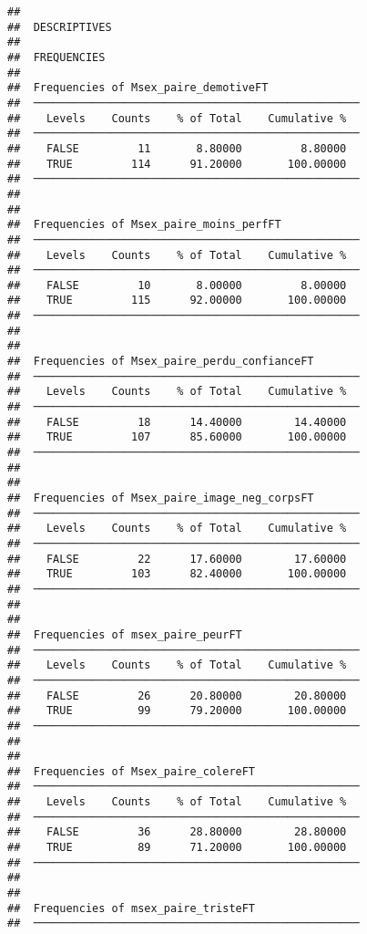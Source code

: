 \documentclass[
]{article}
\begin{document}
\begin{verbatim}
## 
##  DESCRIPTIVES
## 
##  FREQUENCIES
## 
##  Frequencies of Msex_paire_demotiveFT               
##  ────────────────────────────────────────────────── 
##    Levels    Counts    % of Total    Cumulative %   
##  ────────────────────────────────────────────────── 
##    FALSE         11       8.80000         8.80000   
##    TRUE         114      91.20000       100.00000   
##  ────────────────────────────────────────────────── 
## 
## 
##  Frequencies of Msex_paire_moins_perfFT             
##  ────────────────────────────────────────────────── 
##    Levels    Counts    % of Total    Cumulative %   
##  ────────────────────────────────────────────────── 
##    FALSE         10       8.00000         8.00000   
##    TRUE         115      92.00000       100.00000   
##  ────────────────────────────────────────────────── 
## 
## 
##  Frequencies of Msex_paire_perdu_confianceFT        
##  ────────────────────────────────────────────────── 
##    Levels    Counts    % of Total    Cumulative %   
##  ────────────────────────────────────────────────── 
##    FALSE         18      14.40000        14.40000   
##    TRUE         107      85.60000       100.00000   
##  ────────────────────────────────────────────────── 
## 
## 
##  Frequencies of Msex_paire_image_neg_corpsFT        
##  ────────────────────────────────────────────────── 
##    Levels    Counts    % of Total    Cumulative %   
##  ────────────────────────────────────────────────── 
##    FALSE         22      17.60000        17.60000   
##    TRUE         103      82.40000       100.00000   
##  ────────────────────────────────────────────────── 
## 
## 
##  Frequencies of msex_paire_peurFT                   
##  ────────────────────────────────────────────────── 
##    Levels    Counts    % of Total    Cumulative %   
##  ────────────────────────────────────────────────── 
##    FALSE         26      20.80000        20.80000   
##    TRUE          99      79.20000       100.00000   
##  ────────────────────────────────────────────────── 
## 
## 
##  Frequencies of Msex_paire_colereFT                 
##  ────────────────────────────────────────────────── 
##    Levels    Counts    % of Total    Cumulative %   
##  ────────────────────────────────────────────────── 
##    FALSE         36      28.80000        28.80000   
##    TRUE          89      71.20000       100.00000   
##  ────────────────────────────────────────────────── 
## 
## 
##  Frequencies of msex_paire_tristeFT                 
##  ────────────────────────────────────────────────── 

\end{verbatim}
\end{document}
